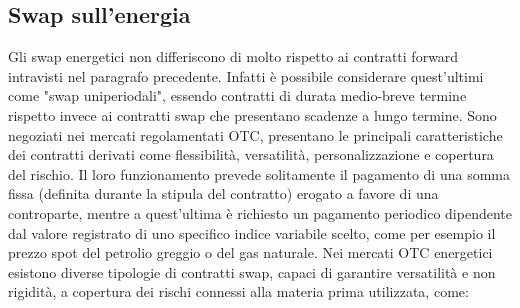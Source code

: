 \documentclass[12pt,a4paper]{report}
\begin{document}
\subsection{Swap sull'energia}

Gli swap energetici non differiscono di molto rispetto ai contratti forward intravisti nel paragrafo precedente. Infatti è possibile considerare quest'ultimi come "swap uniperiodali", essendo contratti di durata medio-breve termine rispetto invece ai contratti swap che presentano scadenze a lungo termine.
Sono negoziati nei mercati regolamentati OTC, presentano le principali caratteristiche dei contratti derivati come flessibilità, versatilità, personalizzazione e copertura del rischio. Il loro funzionamento prevede solitamente il pagamento di una somma fissa (definita durante la stipula del contratto) erogato a favore di una controparte, mentre a quest'ultima è richiesto un pagamento periodico dipendente dal valore registrato di uno specifico indice variabile scelto, come per esempio il prezzo spot del petrolio greggio o del gas naturale.
Nei mercati OTC energetici esistono diverse tipologie di contratti swap, capaci di garantire versatilità e non rigidità, a copertura dei rischi connessi alla materia prima utilizzata, come: 
\end{document}
